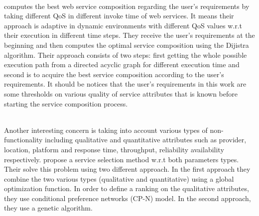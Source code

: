 \documentclass[10pt,journal,compsoc]{IEEEtran}
\begin{document}
%

\cite{liu2009}\\
\cite{liu2009} computes the best web service composition regarding the user's requirements by taking different QoS in different invoke time of web services. It means their approach is adaptive in dynamic environments with different QoS values w.r.t their execution in different time steps. They receive the user's requirements at the beginning and then computes the optimal service composition using the Dijistra algorithm. Their approach consists of two steps: first getting the whole possible execution path from a directed acyclic graph for different execution time and second is to acquire the best service composition according to the user's requirements. It should be notices that the user's requirements in this work are some thresholds on various quality of service attributes that is known before starting the service composition process. 

 \cite{Wang2017} \\
Another interesting concern is taking into account various types of non-functionality including qualitative and quantitative attributes such as provider, location, platform and response time, throughput, reliability availability respectively. \cite{Wang2017} propose a service selection method w.r.t both parameters types. Their solve this problem using two different approach. In the first approach they combine the two various types (qualitative and quantitative) using a global optimization function. In order to define a ranking on the qualitative attributes, they use conditional preference networks (CP-N) model. In the second approach, they use a genetic algorithm. 
\end{document}
